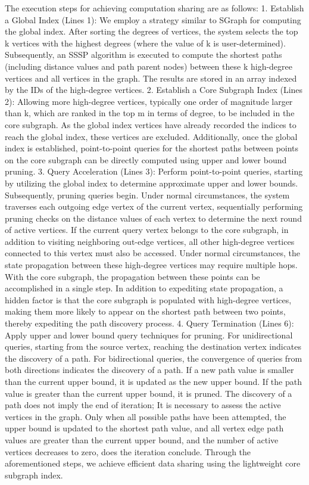 \documentclass[lettersize,journal]{IEEEtran} %
\begin{document}
The execution steps for achieving computation sharing are as follows: 1. Establish a Global Index (Lines 1): We employ a strategy similar to SGraph for computing the global index. After sorting the degrees of vertices, the system selects the top k vertices with the highest degrees (where the value of k is user-determined). Subsequently, an SSSP algorithm is executed to compute the shortest paths (including distance values and path parent nodes) between these k high-degree vertices and all vertices in the graph. The results are stored in an array indexed by the IDs of the high-degree vertices. 2. Establish a Core Subgraph Index (Lines 2): Allowing more high-degree vertices, typically one order of magnitude larger than k, which are ranked in the top m in terms of degree, to be included in the core subgraph. As the global index vertices have already recorded the indices to reach the global index, these vertices are excluded. Additionally, once the global index is established, point-to-point queries for the shortest paths between points on the core subgraph can be directly computed using upper and lower bound pruning. 3. Query Acceleration (Lines 3): Perform point-to-point queries, starting by utilizing the global index to determine approximate upper and lower bounds. Subsequently, pruning queries begin. Under normal circumstances, the system traverses each outgoing edge vertex of the current vertex, sequentially performing pruning checks on the distance values of each vertex to determine the next round of active vertices. If the current query vertex belongs to the core subgraph, in addition to visiting neighboring out-edge vertices, all other high-degree vertices connected to this vertex must also be accessed. Under normal circumstances, the state propagation between these high-degree vertices may require multiple hops. With the core subgraph, the propagation between these points can be accomplished in a single step. In addition to expediting state propagation, a hidden factor is that the core subgraph is populated with high-degree vertices, making them more likely to appear on the shortest path between two points, thereby expediting the path discovery process. 4. Query Termination (Lines 6): Apply upper and lower bound query techniques for pruning. For unidirectional queries, starting from the source vertex, reaching the destination vertex indicates the discovery of a path. For bidirectional queries, the convergence of queries from both directions indicates the discovery of a path. If a new path value is smaller than the current upper bound, it is updated as the new upper bound. If the path value is greater than the current upper bound, it is pruned. The discovery of a path does not imply the end of iteration; It is necessary to assess the active vertices in the graph. Only when all possible paths have been attempted, the upper bound is updated to the shortest path value, and all vertex edge path values are greater than the current upper bound, and the number of active vertices decreases to zero, does the iteration conclude. Through the aforementioned steps, we achieve efficient data sharing using the lightweight core subgraph index.
\end{document}
